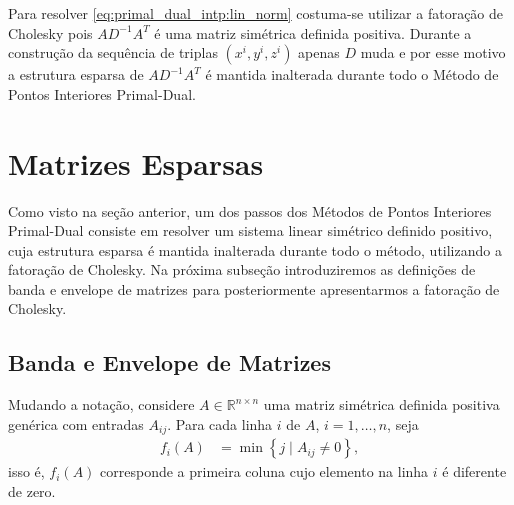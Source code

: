 Para resolver \eqref{eq:primal_dual_intp:lin_norm} costuma-se utilizar a
fatoração de Cholesky pois $A D^{-1} A^T$ é uma matriz simétrica definida
positiva. Durante a construção da sequência de triplas $(x^i, y^i, z^i)$ apenas
$D$ muda e por esse motivo a estrutura esparsa de $A D^{-1} A^T$ é mantida
inalterada durante todo o Método de Pontos Interiores Primal-Dual.

\section{Matrizes Esparsas}
Como visto na seção anterior, um dos passos dos Métodos de Pontos Interiores
Primal-Dual consiste em resolver um sistema linear simétrico definido positivo,
cuja estrutura esparsa é mantida inalterada durante todo o método, utilizando a fatoração de
Cholesky. Na próxima subseção introduziremos as definições de banda e envelope
de matrizes para posteriormente apresentarmos a fatoração de Cholesky.

\subsection{Banda e Envelope de Matrizes}
Mudando a notação, considere $A \in \mathbb{R}^{n \times n}$ uma matriz
simétrica definida positiva genérica com entradas $A_{ij}$. Para cada linha $i$
de $A$, $i = 1, \ldots, n$, seja
\begin{align*}
    f_i(A) &= \min\left\{ j \mid A_{ij} \neq 0 \right\},
\end{align*}
isso é, $f_i(A)$ corresponde a primeira coluna cujo elemento na linha $i$ é
diferente de zero.

